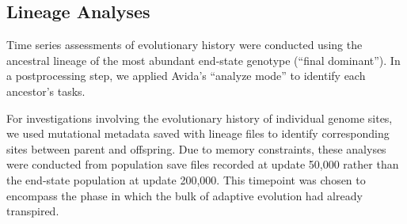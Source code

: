 \subsection{Lineage Analyses}


Time series assessments of evolutionary history were conducted using the ancestral lineage of the most abundant end-state genotype (``final dominant'').
In a postprocessing step, we applied Avida's ``analyze mode'' to identify each ancestor's tasks.

For investigations involving the evolutionary history of individual genome sites, we used mutational metadata saved with lineage files to identify corresponding sites between parent and offspring.
Due to memory constraints, these analyses were conducted from population save files recorded at update 50,000 rather than the end-state population at update 200,000.
This timepoint was chosen to encompass the phase in which the bulk of adaptive evolution had already transpired.

